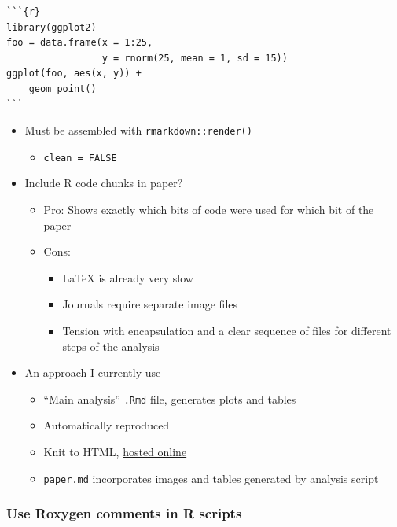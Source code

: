 \documentclass[
]{article}
\providecommand{\tightlist}{%
  \setlength{\itemsep}{0pt}\setlength{\parskip}{0pt}}
\begin{document}
\begin{verbatim}
```{r}
library(ggplot2)
foo = data.frame(x = 1:25, 
                 y = rnorm(25, mean = 1, sd = 15))
ggplot(foo, aes(x, y)) +
    geom_point()
```
\end{verbatim}

\begin{itemize}
\tightlist
\item
  Must be assembled with \texttt{rmarkdown::render()}

  \begin{itemize}
  \tightlist
  \item
    \texttt{clean\ =\ FALSE}
  \end{itemize}
\item
  Include R code chunks in paper?

  \begin{itemize}
  \tightlist
  \item
    Pro: Shows exactly which bits of code were used for which bit of the paper
  \item
    Cons:

    \begin{itemize}
    \tightlist
    \item
      LaTeX is already very slow
    \item
      Journals require separate image files
    \item
      Tension with encapsulation and a clear sequence of files for different steps of the analysis
    \end{itemize}
  \end{itemize}
\item
  An approach I currently use

  \begin{itemize}
  \tightlist
  \item
    ``Main analysis'' \texttt{.Rmd} file, generates plots and tables
  \item
    Automatically reproduced
  \item
    Knit to HTML, \href{https://dhicks.github.io/p_curve/}{hosted online}
  \item
    \texttt{paper.md} incorporates images and tables generated by analysis script
  \end{itemize}
\end{itemize}

\hypertarget{use-roxygen-comments-in-r-scripts}{%
\subsubsection{Use Roxygen comments in R scripts}\label{use-roxygen-comments-in-r-scripts}}
\end{document}
